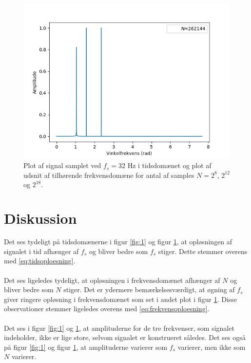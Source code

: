 \begin{figure}[H]
\begin{minipage}{0.49\textwidth}
\includegraphics[width=\textwidth]{figures/frekvensanalyse/32hz_freq3.png}
\end{minipage}
\caption{Plot af signal samplet ved $f_s=32$ Hz i tidsdomænet og plot af udsnit af tilhørende frekvensdomæne for antal af samples $N=2^8$, $2^{12}$ og $2^{18}$.}
\label{fig:2}
\end{figure}
\section{Diskussion}
Det ses tydeligt på tidsdomænerne i figur \ref{fig:1} og figur \ref{fig:2}, at opløsningen af signalet i tid afhænger af $f_s$ og bliver bedre som $f_s$ stiger. Dette stemmer overens med \eqref{eq:tidsoploesning}.\\\\
Det ses ligeledes tydeligt, at opløsningen i frekvensdomænet afhænger af $N$ og bliver bedre som $N$ stiger. Det er ydermere bemærkelsesværdigt, at øgning af $f_s$ giver ringere opløsning i frekvensdomænet som set i andet plot i figur \ref{fig:2}. Disse observationer stemmer ligeledes overens med \eqref{eq:frekvensoploesning}.\\\\
Det ses i figur \ref{fig:1} og \ref{fig:2}, at amplituderne for de tre frekvenser, som signalet indeholder, ikke er lige store, selvom signalet er konstrueret således. Det ses også på figur \ref{fig:1} og figur \ref{fig:2}, at amplituderne varierer som $f_s$ varierer, men ikke som $N$ varierer. 
